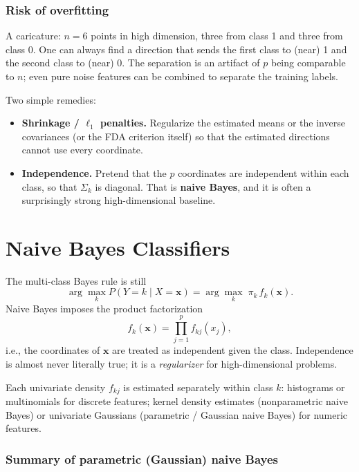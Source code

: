 \documentclass[
]{book}
\providecommand{\tightlist}{%
  \setlength{\itemsep}{0pt}\setlength{\parskip}{0pt}}
\begin{document}
\subsubsection*{Risk of overfitting}\label{risk-of-overfitting-1}

A caricature: \(n = 6\) points in high dimension, three from class 1 and three from class 0. One can always find a direction that sends the first class to (near) 1 and the second class to (near) 0. The separation is an artifact of \(p\) being comparable to \(n\); even pure noise features can be combined to separate the training labels.

Two simple remedies:

\begin{itemize}
\tightlist
\item
  \textbf{Shrinkage / \(\ell_1\) penalties.} Regularize the estimated means or the inverse covariances (or the FDA criterion itself) so that the estimated directions cannot use every coordinate.
\item
  \textbf{Independence.} Pretend that the \(p\) coordinates are independent within each class, so that \(\Sigma_k\) is diagonal. That is \textbf{naive Bayes}, and it is often a surprisingly strong high-dimensional baseline.
\end{itemize}

\section{Naive Bayes Classifiers}\label{naive-bayes-classifiers}

The multi-class Bayes rule is still
\[
\arg\max_k P(Y = k \mid X = \mathbf{x}) = \arg\max_k \; \pi_k \, f_k(\mathbf{x}).
\]
Naive Bayes imposes the product factorization
\[
f_k(\mathbf{x}) = \prod_{j=1}^{p} f_{kj}(x_j),
\]
i.e., the coordinates of \(\mathbf{x}\) are treated as independent given the class. Independence is almost never literally true; it is a \emph{regularizer} for high-dimensional problems.

Each univariate density \(f_{kj}\) is estimated separately within class \(k\): histograms or multinomials for discrete features; kernel density estimates (nonparametric naive Bayes) or univariate Gaussians (parametric / Gaussian naive Bayes) for numeric features.

\subsubsection*{Summary of parametric (Gaussian) naive Bayes}\label{summary-of-parametric-gaussian-naive-bayes}
\end{document}
